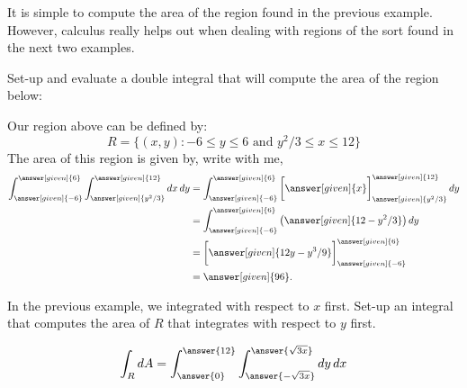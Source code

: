 \documentclass{ximera}
\begin{document}
It is simple to compute the area of the region found in the previous
example. However, calculus really helps out when dealing with regions
of the sort found in the next two examples.

\begin{example}
  Set-up and evaluate a double integral that will compute the area of
  the region below:
  \begin{image}
  \end{image}
  \begin{explanation}
    Our region above can be defined by:
    \[
    R=\{(x,y):\text{$-6\leq y\leq 6$ and $y^2/3\leq x\leq 12$}\}
    \]
    The area of this region is given by, write with me, 
    \begin{align*}
      \int_{\answer[given]{-6}}^{\answer[given]{6}}\int_{\answer[given]{y^2/3}}^{\answer[given]{12}}\d x \d y &= \int_{\answer[given]{-6}}^{\answer[given]{6}} \eval{\answer[given]{x}}_{\answer[given]{y^2/3}}^{\answer[given]{12}} \d y\\
      &=  \int_{\answer[given]{-6}}^{\answer[given]{6}} \left(\answer[given]{12-y^2/3}\right) \d y\\
      &=  \eval{\answer[given]{12y-y^3/9}}_{\answer[given]{-6}}^{\answer[given]{6}}\\
      &= \answer[given]{96}. 
    \end{align*}
  \end{explanation}
\end{example}

\begin{question}
  In the previous example, we integrated with respect to $x$
  first. Set-up an integral that computes the area of $R$ that
  integrates with respect to $y$ first.
  \begin{prompt}
    \[
    \int_R \d A = \int_{\answer{0}}^{\answer{12}}\int_{\answer{-\sqrt{3x}}}^{\answer{\sqrt{3x}}} \d y \d x
    \]
  \end{prompt}
\end{question}
\end{document}
